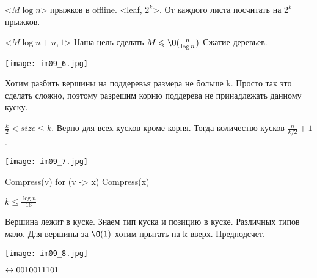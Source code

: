 <$M\log n$> прыжков в offline. <leaf, $2^k$>. От каждого листа посчитать на $2^k$ прыжков.
 
<$M\log n + n, 1$>
Наша цель сделать $M \le \O(\frac{n}{\log n})$
Сжатие деревьев.

\begin{center} 
\texttt{[image: im09\_6.jpg]} 
\end{center}

Хотим разбить вершины на поддеревья размера не больше k. Просто так это сделать сложно, поэтому разрешим корню поддерева не принадлежать данному куску. 

$\frac{k}{2} < size \le k$. Верно для всех кусков кроме корня. Тогда количество кусков $\frac{n}{k/2} + 1$.

\begin{center} 
\texttt{[image: im09\_7.jpg]} 
\end{center}

\begin{cppcode}
Compress(v) {
    for (v -> x) Compress(x)
}
\end{cppcode}

$k \le \frac{\log n}{16}$

Вершина лежит в куске. Знаем тип куска и позицию в куске. Различных типов мало. Для вершины за $\O(1)$ хотим прыгать на k вверх. Предподсчет.

\texttt{[image: im09\_8.jpg]} 

$\leftrightarrow 0010011101$
